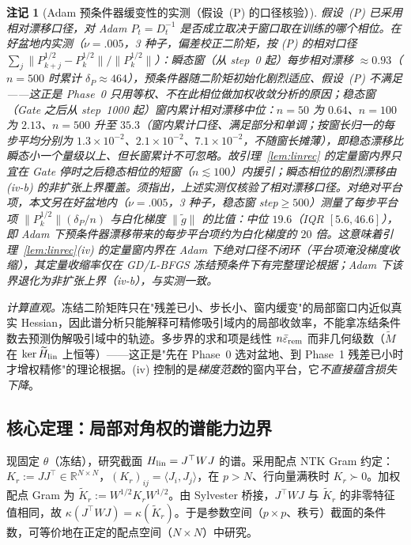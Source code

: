 \documentclass[fontset=windows,11pt]{ctexart}
\newcommand{\R}{\mathbb R}
\newcommand{\W}{W}
\newcommand{\wt}[1]{\widetilde{#1}}
\newtheorem*{remark}{注记}
\numberwithin{equation}{section}
\begin{document}
\begin{remark}[Adam 预条件器缓变性的实测（假设~(P) 的口径核验）]\label{rem:adam-drift}
假设~(P) 已采用相对漂移口径，对 Adam $P_t=D_t^{-1}$ 是否成立取决于窗口取在训练的哪个相位。在好盆地内实测（$\nu=.005$，3 种子，偏差校正二阶矩，按 (P) 的相对口径 $\sum_j\|P_{k+j}^{1/2}-P_k^{1/2}\|/\|P_k^{1/2}\|$）：\emph{瞬态窗}（从 step~0 起）每步相对漂移 $\approx0.93$（$n=500$ 时累计 $\delta_P\approx464$），预条件器随二阶矩初始化剧烈适应、假设~(P) 不满足——这正是 Phase~0 只用等权、不在此相位做加权收敛分析的原因；\emph{稳态窗}（Gate 之后从 step~1000 起）窗内累计相对漂移中位：$n=50$ 为 $0.64$、$n=100$ 为 $2.13$、$n=500$ 升至 $35.3$（窗内累计口径、满足部分和单调；按窗长归一的每步平均分别为 $1.3\times10^{-2}$、$2.1\times10^{-2}$、$7.1\times10^{-2}$，不随窗长摊薄），即稳态漂移比瞬态小一个量级以上、但长窗累计不可忽略。故引理~\ref{lem:linrec} 的定量窗内界只宜在 Gate 停时之后稳态相位的短窗（$n\lesssim100$）内援引；瞬态相位的剧烈漂移由 (iv-b) 的非扩张上界覆盖。须指出，上述实测仅核验了\emph{相对}漂移口径。对\emph{绝对}平台项，本文另在好盆地内（$\nu=.005$，3 种子，稳态窗 step$\ge500$）测量了每步平台项 $\|P_k^{1/2}\|(\delta_P/n)$ 与白化梯度 $\|\wt g\|$ 的比值：中位 $19.6$（IQR $[5.6,46.6]$），即 Adam 下预条件器漂移带来的每步平台项约为白化梯度的 $20$ 倍。这意味着引理~\ref{lem:linrec}(iv) 的定量窗内界在 Adam 下\emph{绝对口径不闭环}（平台项淹没梯度收缩），其定量收缩率仅在 GD/L-BFGS 冻结预条件下有完整理论根据；Adam 下该界退化为非扩张上界（iv-b），与实测一致。
\end{remark}
\noindent\emph{计算直观。}冻结二阶矩阵只在"残差已小、步长小、窗内缓变"的局部窗口内近似真实 Hessian，因此谱分析只能解释可精修吸引域内的局部收敛率，不能拿冻结条件数去预测伪解吸引域中的轨迹。多步界的求和项是线性 $n\bar\varepsilon_{\rm rem}$ 而非几何级数（$\wt M$ 在 $\ker\wt H_{\rm lin}$ 上恒等）——这正是"先在 Phase~0 选对盆地、到 Phase~1 残差已小时才增权精修"的理论根据。(iv) 控制的是\emph{梯度范数}的窗内平台，它\emph{不直接蕴含损失下降}。

\subsection{核心定理：局部对角权的谱能力边界}\label{sec:R-theory}

现固定 $\theta$（冻结），研究截面 $H_{\rm lin}=J^\top\W J$ 的谱。采用配点 NTK Gram 约定：$K_r:=JJ^\top\in\R^{N\times N}$，$(K_r)_{ij}=\langle J_i,J_j\rangle$，在 $p>N$、行向量满秩时 $K_r\succ0$。加权配点 Gram 为 $\widetilde K_r:=\W^{1/2}K_r\W^{1/2}$。由 Sylvester 桥接，$J^\top\W J$ 与 $\widetilde K_r$ 的非零特征值相同，故 $\kappa(J^\top\W J)=\kappa(\widetilde K_r)$。于是参数空间（$p\times p$、秩亏）截面的条件数，可等价地在正定的配点空间（$N\times N$）中研究。
\end{document}
